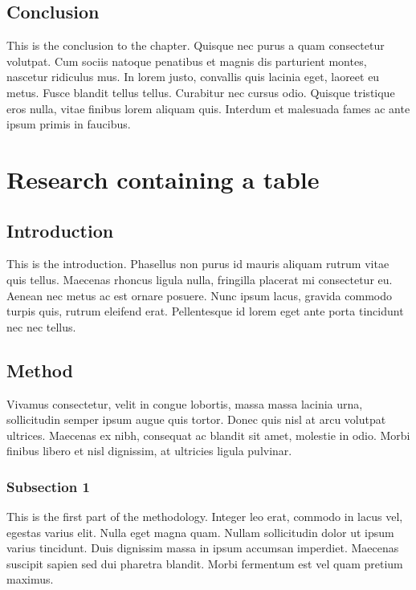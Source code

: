 \hypertarget{conclusion-1}{%
\subsection{Conclusion}\label{conclusion-1}}

This is the conclusion to the chapter. Quisque nec purus a quam
consectetur volutpat. Cum sociis natoque penatibus et magnis dis
parturient montes, nascetur ridiculus mus. In lorem justo, convallis
quis lacinia eget, laoreet eu metus. Fusce blandit tellus tellus.
Curabitur nec cursus odio. Quisque tristique eros nulla, vitae
finibus lorem aliquam quis. Interdum et malesuada fames ac ante
ipsum primis in faucibus.

\hypertarget{research-containing-a-table}{%
\section{Research containing a
table}\label{research-containing-a-table}}

\hypertarget{introduction-2}{%
\subsection{Introduction}\label{introduction-2}}

This is the introduction. Phasellus non purus id mauris aliquam
rutrum vitae quis tellus. Maecenas rhoncus ligula nulla, fringilla
placerat mi consectetur eu. Aenean nec metus ac est ornare posuere.
Nunc ipsum lacus, gravida commodo turpis quis, rutrum eleifend erat.
Pellentesque id lorem eget ante porta tincidunt nec nec tellus.

\hypertarget{method-1}{%
\subsection{Method}\label{method-1}}

Vivamus consectetur, velit in congue lobortis, massa massa lacinia
urna, sollicitudin semper ipsum augue quis tortor. Donec quis nisl
at arcu volutpat ultrices. Maecenas ex nibh, consequat ac blandit
sit amet, molestie in odio. Morbi finibus libero et nisl dignissim,
at ultricies ligula pulvinar.

\hypertarget{subsection-1-1}{%
\subsubsection{Subsection 1}\label{subsection-1-1}}

This is the first part of the methodology. Integer leo erat, commodo
in lacus vel, egestas varius elit. Nulla eget magna quam. Nullam
sollicitudin dolor ut ipsum varius tincidunt. Duis dignissim massa
in ipsum accumsan imperdiet. Maecenas suscipit sapien sed dui
pharetra blandit. Morbi fermentum est vel quam pretium maximus.

